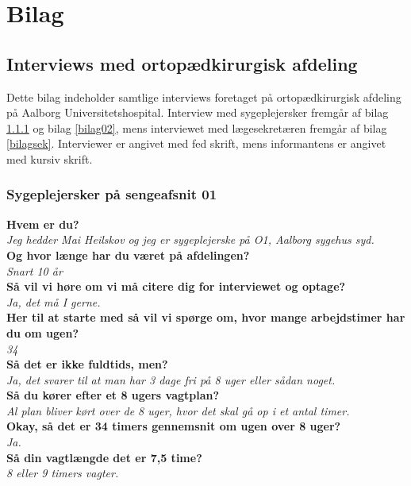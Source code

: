 \chapter{Bilag}

\section{Interviews med ortopædkirurgisk afdeling}
Dette bilag indeholder samtlige interviews foretaget på ortopædkirurgisk afdeling på Aalborg Universitetshospital. Interview med sygeplejersker fremgår af bilag \ref{bilag01} og bilag \ref{bilag02}, mens interviewet med lægesekretæren fremgår af bilag \ref{bilagsek}. Interviewer er angivet med fed skrift, mens informantens er angivet med kursiv skrift. 

\subsection{Sygeplejersker på sengeafsnit 01} \label{bilag01}
\textbf{Hvem er du?} \\
\noindent
\textit{Jeg hedder Mai Heilskov og jeg er sygeplejerske på O1, Aalborg sygehus syd. } \\
\noindent
\textbf{Og hvor længe har du været på afdelingen?}\\
\noindent
\textit{Snart 10 år} \\
\noindent
\textbf{Så vil vi høre om vi må citere dig for interviewet og optage?}\\
\noindent
\textit{ Ja, det må I gerne.}  \\
\noindent
\textbf{Her til at starte med så vil vi spørge om, hvor mange arbejdstimer har du om ugen?} \\
\noindent
\textit{34} \\
\noindent
\textbf{Så det er ikke fuldtids, men?} \\
\noindent
\textit{Ja, det svarer til at man har 3 dage fri på 8 uger eller sådan noget.} \\
\noindent
\textbf{Så du kører efter et 8 ugers vagtplan?} \\
\noindent
\textit{Al plan bliver kørt over de 8 uger, hvor det skal gå op i et antal timer.} \\
\noindent
\textbf{Okay, så det er 34 timers gennemsnit om ugen over 8 uger?} \\
\noindent
\textit{Ja.} \\
\noindent
\textbf{Så din vagtlængde det er 7,5 time? } \\
\noindent
\textit{8 eller 9 timers vagter.} \\
